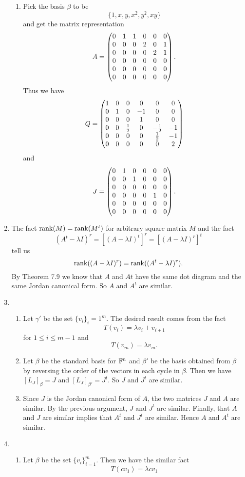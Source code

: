 \begin{enumerate}
\begin{enumerate}
\item Pick the basis $\beta $ to be 
\[\{1,x,y,x^2,y^2,xy\}\]
and get the matrix representation 
\[A=\begin{pmatrix}0 & 1 & 1 & 0 & 0 & 0\cr 0 & 0 & 0 & 2 & 0 & 1\cr 0 & 0 & 0 & 0 & 2 & 1\cr 0 & 0 & 0 & 0 & 0 & 0\cr 0 & 0 & 0 & 0 & 0 & 0\cr 0 & 0 & 0 & 0 & 0 & 0\end{pmatrix}.\]
Thus we have 
\[Q=\begin{pmatrix}1 & 0 & 0 & 0 & 0 & 0\cr 0 & 1 & 0 & -1 & 0 & 0\cr 0 & 0 & 0 & 1 & 0 & 0\cr 0 & 0 & \frac{1}{2} & 0 & -\frac{1}{2} & -1\cr 0 & 0 & 0 & 0 & \frac{1}{2} & -1\cr 0 & 0 & 0 & 0 & 0 & 2\end{pmatrix}\]
and 
\[J=\begin{pmatrix}0 & 1 & 0 & 0 & 0 & 0\cr 0 & 0 & 1 & 0 & 0 & 0\cr 0 & 0 & 0 & 0 & 0 & 0\cr 0 & 0 & 0 & 0 & 1 & 0\cr 0 & 0 & 0 & 0 & 0 & 0\cr 0 & 0 & 0 & 0 & 0 & 0\end{pmatrix}.\]
\end{enumerate}
\item The fact $\operatorname{rank}(M)=\operatorname{rank}(M^t)$ for arbitrary square matrix $M$ and the fact 
\[(A^t-\lambda I)^r=[(A-\lambda I)^t]^r=[(A-\lambda I)^r]^t\]
tell us 
\[\operatorname{rank}((A-\lambda I)^r)=\operatorname{rank}((A^t-\lambda I)^r).\]
By Theorem 7.9 we know that $A$ and $At$ have the same dot diagram and the same Jordan canonical form. So $A$ and $A^t$ are similar.
\item \begin{enumerate}
\item Let $\gamma'$ be the set $\{v_i\}_i=1^m$. The desired result comes from the fact 
\[T(v_i)=\lambda v_i+v_{i+1}\]
for $1\leq i\leq m-1$ and 
\[T(v_m)=\lambda v_m.\]
\item Let $\beta$ be the standard basis for $\mathbb{F}^n$ and $\beta'$ be the basis obtained from $\beta$ by reversing the order of the vectors in each cycle in $\beta$. Then we have $[L_J]_{\beta}=J$ and $[L_J]_{\beta'}=J^t$. So $J$ and $J^t$ are similar.
\item Since $J$ is the Jordan canonical form of $A$, the two matrices $J$ and $A$ are similar. By the previous argument, $J$ and $J^t$ are similar. Finally, that $A$ and $J$ are similar implies that $A^t$ and $J^t$ are similar. Hence $A$ and $A^t$ are similar.
\end{enumerate}
\item \begin{enumerate}
\item Let $\beta$ be the set $\{v_i\}_{i=1}^m$. Then we have the similar fact 
\[T(cv_1)=\lambda cv_1\]

\end{enumerate}
\end{enumerate}
